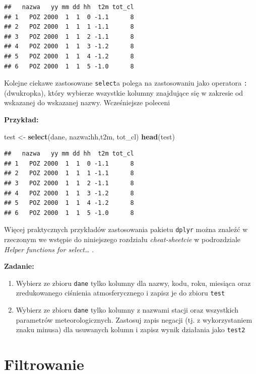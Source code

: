\documentclass[]{book}
\newenvironment{Shaded}{\begin{snugshade}}{\end{snugshade}}
\newcommand{\KeywordTok}[1]{\textcolor[rgb]{0.13,0.29,0.53}{\textbf{#1}}}
\newcommand{\StringTok}[1]{\textcolor[rgb]{0.31,0.60,0.02}{#1}}
\newcommand{\OperatorTok}[1]{\textcolor[rgb]{0.81,0.36,0.00}{\textbf{#1}}}
\newcommand{\NormalTok}[1]{#1}
\providecommand{\tightlist}{%
  \setlength{\itemsep}{0pt}\setlength{\parskip}{0pt}}
\theoremstyle{definition}
\theoremstyle{definition}
\theoremstyle{definition}
\theoremstyle{remark}
\begin{document}
\begin{verbatim}
##   nazwa   yy mm dd hh  t2m tot_cl
## 1   POZ 2000  1  1  0 -1.1      8
## 2   POZ 2000  1  1  1 -1.1      8
## 3   POZ 2000  1  1  2 -1.1      8
## 4   POZ 2000  1  1  3 -1.2      8
## 5   POZ 2000  1  1  4 -1.2      8
## 6   POZ 2000  1  1  5 -1.0      8
\end{verbatim}

Kolejne ciekawe zastosowane \texttt{select}a polega na zastosowaniu jako
operatora \texttt{:} (dwukropka), który wybierze wszystkie kolumny
znajdujące się w zakresie od wskazanej do wskazanej nazwy. Wcześniejsze
poleceni

\textbf{Przykład:}

\begin{Shaded}
\begin{Highlighting}[]
\NormalTok{test <-}\StringTok{ }\KeywordTok{select}\NormalTok{(dane, nazwa}\OperatorTok{:}\NormalTok{hh,t2m, tot_cl)}
\KeywordTok{head}\NormalTok{(test)}
\end{Highlighting}
\end{Shaded}

\begin{verbatim}
##   nazwa   yy mm dd hh  t2m tot_cl
## 1   POZ 2000  1  1  0 -1.1      8
## 2   POZ 2000  1  1  1 -1.1      8
## 3   POZ 2000  1  1  2 -1.1      8
## 4   POZ 2000  1  1  3 -1.2      8
## 5   POZ 2000  1  1  4 -1.2      8
## 6   POZ 2000  1  1  5 -1.0      8
\end{verbatim}

Więcej praktycznych przykładów zastosowania pakietu \texttt{dplyr} można
znaleźć w rzeczonym we wstępie do niniejszego rozdziału
\emph{cheat-sheetcie} w podrozdziale \emph{Helper functions for
select\ldots{} } .

\textbf{Zadanie:}

\begin{enumerate}
\def\labelenumi{\arabic{enumi}.}
\tightlist
\item
  Wybierz ze zbioru \texttt{dane} tylko kolumny dla nazwy, kodu, roku,
  miesiąca oraz zredukowanego ciśnienia atmosferycznego i zapisz je do
  zbioru \texttt{test}
\item
  Wybierz ze zbioru \texttt{dane} tylko kolumny z nazwami stacji oraz
  wszystkich parametrów meteorologicznych. Zastosuj zapis negacji (tj. z
  wykorzystaniem znaku minusa) dla usuwanych kolumn i zapisz wynik
  działania jako \texttt{test2}
\end{enumerate}

\section{Filtrowanie}\label{filtrowanie}
\end{document}
